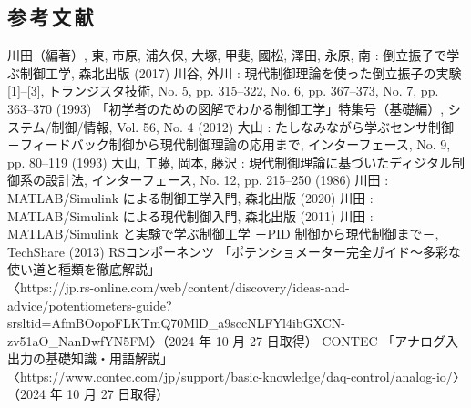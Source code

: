 \newpage
\begin{center}
	\section*{参\,考\,文\,献}                      %
\end{center}

\begin{thebibliography}{10}
	 川田（編著）, 東, 市原, 浦久保, 大塚, 甲斐, 國松, 澤田, 永原, 南 : 倒立振子で学ぶ制御工学, 森北出版 (2017)
	 川谷, 外川 : 現代制御理論を使った倒立振子の実験 [1]–[3], トランジスタ技術, No. 5, pp. 315–322, No. 6, pp. 367–373, No. 7, pp. 363–370 (1993)
	 「初学者のための図解でわかる制御工学」特集号（基礎編）, システム/制御/情報, Vol. 56, No. 4 (2012)
	 大山 : たしなみながら学ぶセンサ制御 －フィードバック制御から現代制御理論の応用まで, インターフェース, No. 9, pp. 80–119 (1993)
	 大山, 工藤, 岡本, 藤沢 : 現代制御理論に基づいたディジタル制御系の設計法, インターフェース, No. 12, pp. 215–250 (1986)
	 川田 : MATLAB/Simulink による制御工学入門, 森北出版 (2020)
	 川田 : MATLAB/Simulink による現代制御入門, 森北出版 (2011)
	 川田 : MATLAB/Simulink と実験で学ぶ制御工学 －PID 制御から現代制御まで－, TechShare (2013)
	 RSコンポーネンツ 「ポテンショメーター完全ガイド～多彩な使い道と種類を徹底解説」\\
	〈https://jp.rs-online.com/web/content/discovery/ideas-and-advice/potentiometers-guide?srsltid=AfmBOopoFLKTmQ70MlD\_a9sccNLFYl4ibGXCN-zv51aO\_NanDwfYN5FM〉（2024 年 10 月 27 日取得）
	 CONTEC 「アナログ入出力の基礎知識・用語解説」\\
	〈https://www.contec.com/jp/support/basic-knowledge/daq-control/analog-io/〉（2024 年 10 月 27 日取得）
\end{thebibliography}

